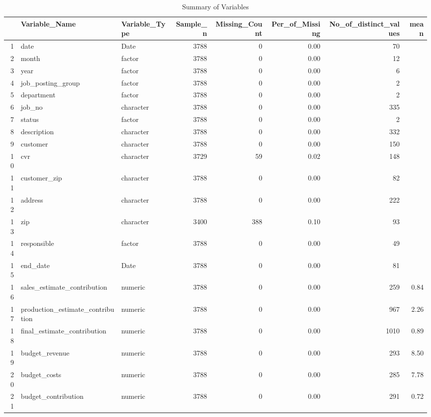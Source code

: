 \begin{sidewaystable}[ht]
\centering
\caption{Summary of Variables} 
\begin{tabular}{rllrrrrr}
  \hline
 & Variable\_Name & Variable\_Type & Sample\_n & Missing\_Count & Per\_of\_Missing & No\_of\_distinct\_values & mean \\ 
  \hline
1 & date & Date & 3788 &   0 & 0.00 &  70 &  \\ 
  2 & month & factor & 3788 &   0 & 0.00 &  12 &  \\ 
  3 & year & factor & 3788 &   0 & 0.00 &   6 &  \\ 
  4 & job\_posting\_group & factor & 3788 &   0 & 0.00 &   2 &  \\ 
  5 & department & factor & 3788 &   0 & 0.00 &   2 &  \\ 
  6 & job\_no & character & 3788 &   0 & 0.00 & 335 &  \\ 
  7 & status & factor & 3788 &   0 & 0.00 &   2 &  \\ 
  8 & description & character & 3788 &   0 & 0.00 & 332 &  \\ 
  9 & customer & character & 3788 &   0 & 0.00 & 150 &  \\ 
  10 & cvr & character & 3729 &  59 & 0.02 & 148 &  \\ 
  11 & customer\_zip & character & 3788 &   0 & 0.00 &  82 &  \\ 
  12 & address & character & 3788 &   0 & 0.00 & 222 &  \\ 
  13 & zip & character & 3400 & 388 & 0.10 &  93 &  \\ 
  14 & responsible & factor & 3788 &   0 & 0.00 &  49 &  \\ 
  15 & end\_date & Date & 3788 &   0 & 0.00 &  81 &  \\ 
  16 & sales\_estimate\_contribution & numeric & 3788 &   0 & 0.00 & 259 & 0.84 \\ 
  17 & production\_estimate\_contribution & numeric & 3788 &   0 & 0.00 & 967 & 2.26 \\ 
  18 & final\_estimate\_contribution & numeric & 3788 &   0 & 0.00 & 1010 & 0.89 \\ 
  19 & budget\_revenue & numeric & 3788 &   0 & 0.00 & 293 & 8.50 \\ 
  20 & budget\_costs & numeric & 3788 &   0 & 0.00 & 285 & 7.78 \\ 
  21 & budget\_contribution & numeric & 3788 &   0 & 0.00 & 291 & 0.72 \\ 

\end{tabular}
\end{sidewaystable}

